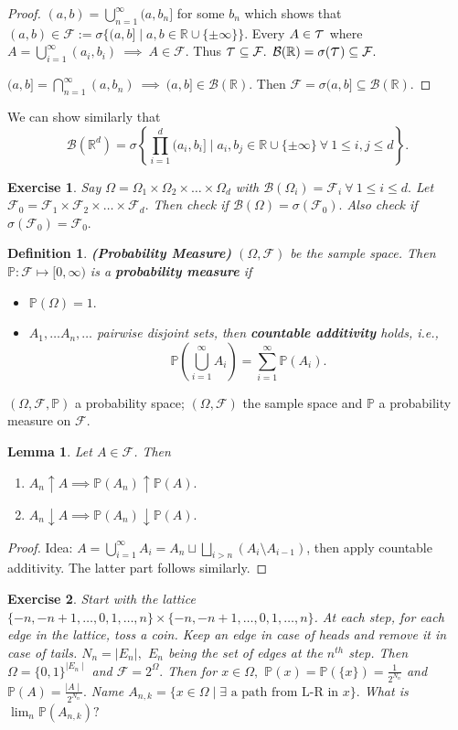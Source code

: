 \documentclass{article}
\newcommand{\1}{\mathds{1}}
\newcommand{\R}{\mathbb{R}}
\newcommand{\F}{\mathcal{F}}
\newcommand{\B}{\mathcal{B}}
\newcommand{\PB}{\mathbb{P}}
\newcommand{\lf}{\left}
\newcommand{\rg}{\right}
\newcommand{\f}[2]{\frac{#1}{#2}}
\newcommand{\Tau}{\text{\Large{$\tau$}}}
\newcommand{\sm}{\setminus}
\newtheorem{lemma}[theorem]{Lemma}
\newtheorem{definition}[theorem]{Definition}
\newtheorem{exercise}{Exercise}
\begin{document}
\begin{proof}
    $(a,b)=\bigcup_{n=1}^\infty (a,b_n]$ for some $b_n$ which shows that $(a,b)\in\F:=\sigma\{(a,b]\mid a,b\in\R\cup \{\pm\infty\}\}.$
    Every $A\in \Tau$ where $A=\bigcup_{i=1}^\infty (a_i,b_i)\ \implies\ A\in\F.$ Thus $\Tau\subseteq\F.$ $\B(\R)=\sigma(\Tau)\subseteq\F.$ 
    
    $(a,b]=\bigcap_{n=1}^{\infty}(a,b_n)\ \implies\ (a,b]\in \B(\R).$ Then $\F=\sigma{(a,b]}\subseteq \B(\R).$ 
\end{proof}
We can show similarly that $$\B(\R^d)=\sigma\lf\{\prod_{i=1}^d(a_i,b_i]\mid a_i,b_j\in \R\cup \{\pm\infty\}\ \forall\ 1\leq i,j\leq d\rg\}.$$
\begin{exercise}
    Say $\Omega=\Omega_1\times\Omega_2\times\ldots\times \Omega_d$ with $\B(\Omega_i)=\F_i\ \forall\ 1\leq i\leq d.$ Let $\F_0=\F_1\times \F_2\times\ldots\times \F_d.$ Then check if $\B(\Omega)=\sigma(\F_0).$ Also check if $\sigma(\F_0)=\F_0.$
\end{exercise}
\begin{definition}\textbf{(Probability Measure)}
    $(\Omega,\F)$ be the sample space. Then $\PB:\F\mapsto [0,\infty)$ is a \textbf{probability measure} if 
    \begin{itemize}
        \item $\PB(\Omega)=1.$
        \item $A_1,\ldots A_n,\ldots$ pairwise disjoint sets, then \textbf{countable additivity} holds, i.e., $$\PB\lf(\bigcup_{i=1}^\infty A_i\rg)=\sum_{i=1}^\infty \PB(A_i).$$
    \end{itemize}
\end{definition}
$(\Omega,\F,\PB)$ a probability space; $(\Omega,\F)$ the sample space and $\PB$ a probability measure on $\F.$
\begin{lemma}
    Let $A\in \F$. Then
    \begin{enumerate}
        \item $A_n\uparrow A\implies \PB(A_n)\uparrow \PB(A).$
        \item $A_n\downarrow A\implies \PB(A_n)\downarrow \PB(A).$
    \end{enumerate}
\end{lemma}
\begin{proof}
    Idea: $A=\bigcup_{i=1}^{\infty}A_i=A_n\sqcup\bigsqcup_{i>n}(A_i\sm A_{i-1})$, then apply countable additivity. The latter part follows similarly.
\end{proof}
\begin{exercise}
    Start with the lattice $\{-n,-n+1,\ldots,0,1,\ldots,n\}\times \{-n,-n+1,\ldots,0,1,\ldots,n\}$. At each step, for each edge in the lattice, toss a coin. Keep an edge in case of heads and remove it in case of tails. 
    $N_n=\mid E_n\mid,$ $E_n$ being the set of edges at the $n^{th}$ step. Then $\Omega=\{0,1\}^{\mid E_n\mid}$ and $\F=2^\Omega.$ Then for $x\in\Omega,$ $\PB(x)=\PB(\{x\})=\f1{2^{N_n}}$ and $\PB(A)=\f{\mid A\mid}{2^{N_n}}.$ Name $A_{n,k}=\{x\in\Omega\mid \exists\text{ a path from L-R in } x\}.$ What is $\lim_n \PB(A_{n,k})?$
\end{exercise}
\end{document}
